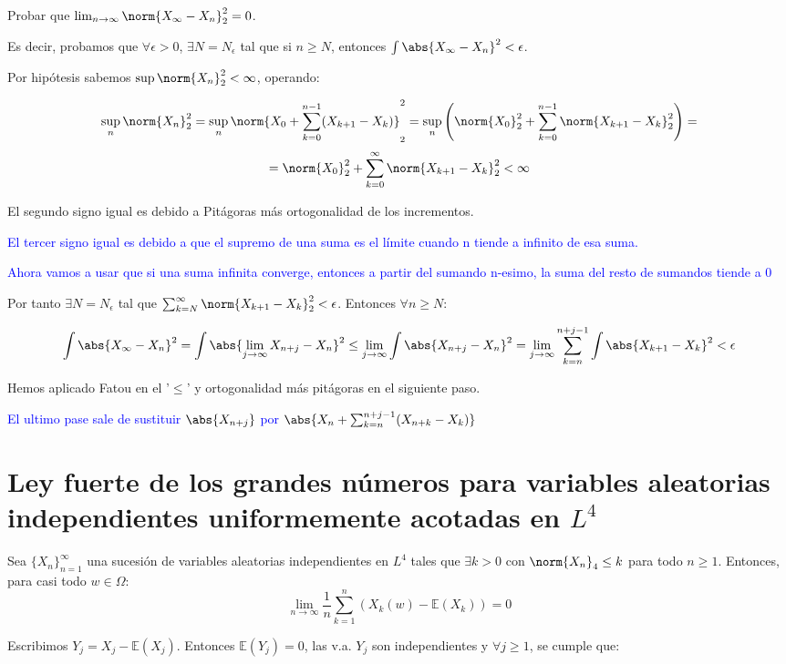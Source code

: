 \documentclass{apuntes}
\begin{document}
Probar que $\lim_{n \rightarrow \infty}\norm{X_{\infty}-X_n}_2^2=0$.


Es decir, probamos que $\forall \epsilon > 0$, $\exists N = N_{\epsilon}$ tal que si $n\geq N$, entonces $\int \abs{X_{\infty}-X_n}^2 < \epsilon$. 

Por hipótesis sabemos $\sup \norm{X_n}_2^2 < \infty$, operando:

\[
\sup_n \norm{X_n}_2^2 = \sup_n \norm{X_0 +\sum_{k=0}^{n-1}(X_{k+1}-X_k)}_2^2 = \sup_n \left( \norm{X_0}_2^2 +\sum_{k=0}^{n-1}\norm{X_{k+1}-X_k}_2^2 \right) =
\]
\[
= \norm{X_0}_2^2 +\sum_{k=0}^{\infty}\norm{X_{k+1}-X_k}_2^2 < \infty
\]

El segundo signo igual es debido a Pitágoras más ortogonalidad de los incrementos.

\textcolor{blue}{El tercer signo igual es debido a que el supremo de una suma es el límite cuando n tiende a infinito de esa suma.}

\textcolor{blue}{Ahora vamos a usar que si una suma infinita converge, entonces a partir del sumando n-esimo, la suma del resto de sumandos tiende a 0}

Por tanto $\exists N = N_{\epsilon}$ tal que $\sum_{k=N}^{\infty} \norm{X_{k+1}-X_k}_2^2 < \epsilon$. Entonces $\forall n \geq N$:

\[
\int \abs{X_{\infty}-X_n}^2 = \int \abs{\lim_{j \rightarrow \infty} X_{n+j}-X_n}^2 \leq \lim_{j \rightarrow \infty} \int \abs{ X_{n+j}-X_n}^2 = \lim_{j \rightarrow \infty} \sum_{k=n}^{n+j-1}\int \abs{X_{k+1}-X_k}^2 < \epsilon
\]

Hemos aplicado Fatou en el '$\leq$' y ortogonalidad más pitágoras en el siguiente paso.


\textcolor{blue}{El ultimo pase sale de sustituir $\abs{X_{n+j}}$ por $\abs{X_n + \sum_{k=n}^{n+j-1}(X_{n+k}-X_k)}$}


\section{Ley fuerte de los grandes números para variables aleatorias independientes uniformemente acotadas en $L^4$}
Sea $\{X_n\}_{n=1}^{\infty}$ una sucesión de variables aleatorias independientes en $L^4$ tales que $\exists k>0$ con $\norm{X_n}_4 \leq k$ para todo $n \geq 1$. Entonces, para casi todo $w \in \Omega$:
\[
\lim_{n \rightarrow \infty} \frac{1}{n}\sum_{k=1}^{n}\left( X_k(w) - \mathbb{E}(X_k) \right)= 0
\]


Escribimos $Y_j=X_j-\mathbb{E}(X_j)$. Entonces $\mathbb{E}(Y_j)=0$, las v.a. $Y_j$ son independientes y $\forall j \geq 1$, se cumple que:
\end{document}
